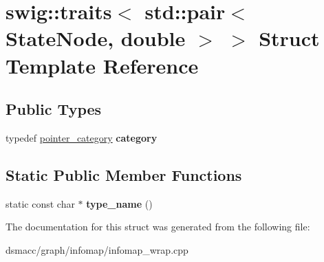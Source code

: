 \hypertarget{structswig_1_1traits_3_01std_1_1pair_3_01StateNode_00_01double_01_4_01_4}{}\section{swig\+:\+:traits$<$ std\+:\+:pair$<$ State\+Node, double $>$ $>$ Struct Template Reference}
\label{structswig_1_1traits_3_01std_1_1pair_3_01StateNode_00_01double_01_4_01_4}
\subsection*{Public Types}
\begin{DoxyCompactItemize}
\item 
\mbox{\label{structswig_1_1traits_3_01std_1_1pair_3_01StateNode_00_01double_01_4_01_4_a34bf520aa193716749fb0b83fb8308ee}} 
typedef \mbox{\hyperlink{structswig_1_1pointer__category}{pointer\+\_\+category}} {\bfseries category}
\end{DoxyCompactItemize}
\subsection*{Static Public Member Functions}
\begin{DoxyCompactItemize}
\item 
\mbox{\label{structswig_1_1traits_3_01std_1_1pair_3_01StateNode_00_01double_01_4_01_4_a6ef2747c66378fedf58e078d4c78f75e}} 
static const char $\ast$ {\bfseries type\+\_\+name} ()
\end{DoxyCompactItemize}


The documentation for this struct was generated from the following file\+:\begin{DoxyCompactItemize}
\item 
dsmacc/graph/infomap/infomap\+\_\+wrap.\+cpp\end{DoxyCompactItemize}
